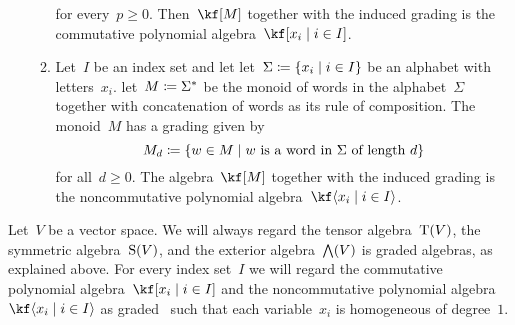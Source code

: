 \begin{examples}
\begin{enumerate}
\begin{enumerate}
					for every~$p \geq 0$.
					Then~$\kf[M]$ together with the induced grading is the commutative polynomial algebra~$\kf[x_i \suchthat i \in I]$.
				\item
					Let~$I$ be an index set and let let~$\Sigma \defined \{x_i \suchthat i \in I\}$ be an alphabet with letters~$x_i$.
					let~$M \coloneqq \Sigma^*$ be the monoid of words in the alphabet~$\Sigma$ together with concatenation of words as its rule of composition.
					The monoid~$M$ has a grading given by
					\[
						M_d
						\defined
						\{
							w \in M
						\suchthat
							\text{$w$ is a word in~$\Sigma$ of length~$d$}
						\}
					\]
					for all~$d \geq 0$.
					The algebra~$\kf[M]$ together with the induced grading is the noncommutative polynomial algebra~$\kf\gen{x_i \suchthat i \in I}$.
			\end{enumerate}
	\end{enumerate}
\end{examples}


\begin{convention}
	Let~$V$ be a vector space.
	We will always regard the tensor algebra~$\operatorname{T}(V)$, the symmetric algebra~$\operatorname{S}(V)$, and the exterior algebra~$\operatorname{\bigwedge}(V)$ is graded algebras, as explained above.
	For every index set~$I$ we will regard the commutative polynomial algebra~$\kf[ x_i \suchthat i \in I]$ and the noncommutative polynomial algebra~$\kf\gen{ x_i \suchthat i \in I}$ as graded~\algebras{$\kf$} such that each variable~$x_i$ is homogeneous of degree~$1$.
\end{convention}



